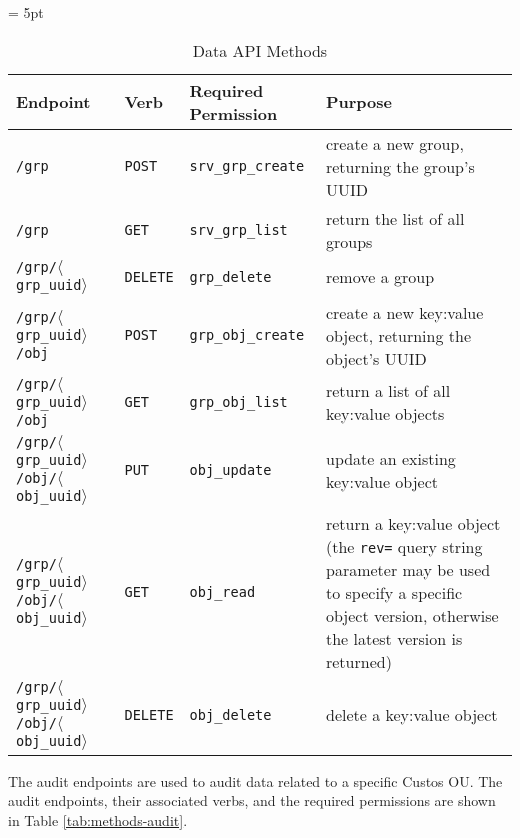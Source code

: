 \begin{table}[!tbh]
  \vspace{1ex}
  \begin{center}
    \tabulinesep = 5pt
    \begin{tabu} to \textwidth
      { | X[2.5,l,m]
        | X[.5,l,m]
        | X[1,l,m]
        | X[1,l,m]
        | }
      \hline
      \textbf{Endpoint}
      & \textbf{Verb}
      & \textbf{Required Permission}
      & \textbf{Purpose}
      \\ \hline
      \texttt{/grp}
      & \texttt{POST} & \texttt{srv\_grp\_create}
      & create a new group, returning the group's UUID
      \\ \hline
      \texttt{/grp}
      & \texttt{GET} & \texttt{srv\_grp\_list}
      & return the list of all groups
      \\ \hline
      \texttt{/grp/$\langle$grp\_uuid$\rangle$}
      & \texttt{DELETE} & \texttt{grp\_delete}
      & remove a group
      \\ \hline
      \texttt{/grp/$\langle$grp\_uuid$\rangle$/obj}
      & \texttt{POST} & \texttt{grp\_obj\_create}
      & create a new key:value object, returning the object's UUID
      \\ \hline
      \texttt{/grp/$\langle$grp\_uuid$\rangle$/obj}
      & \texttt{GET} & \texttt{grp\_obj\_list}
      & return a list of all key:value objects
      \\ \hline
      \texttt{/grp/$\langle$grp\_uuid$\rangle$/obj/$\langle$obj\_uuid$\rangle$}
      & \texttt{PUT} & \texttt{obj\_update}
      & update an existing key:value object
      \\ \hline
      \texttt{/grp/$\langle$grp\_uuid$\rangle$/obj/$\langle$obj\_uuid$\rangle$}
      & \texttt{GET} & \texttt{obj\_read}
      & return a key:value object (the \texttt{rev=} query string
        parameter may be used to specify a specific object version,
        otherwise the latest version is returned)
      \\ \hline
      \texttt{/grp/$\langle$grp\_uuid$\rangle$/obj/$\langle$obj\_uuid$\rangle$}
      & \texttt{DELETE} & \texttt{obj\_delete}
      & delete a key:value object
      \\ \hline
    \end{tabu}
  \end{center}
  \caption{Data API Methods}
  \label{tab:methods-data}
\end{table}

The audit endpoints are used to audit data related to a specific
Custos OU. The audit endpoints, their associated verbs, and the
required permissions are shown in Table \ref{tab:methods-audit}.

